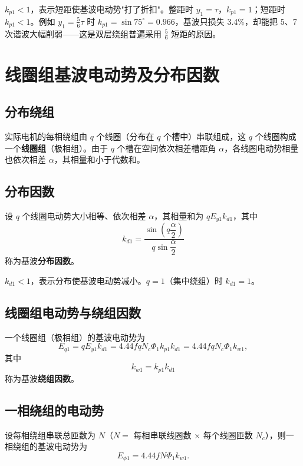 
$k_{p1}<1$，表示短距使基波电动势"打了折扣"。整距时 $y_1=\tau$，$k_{p1}=1$；短距时 $k_{p1}<1$。例如 $y_1=\tfrac56\tau$ 时 $k_{p1}=\sin75^\circ=0.966$，基波只损失 3.4\%，却能把 5、7 次谐波大幅削弱——这是双层绕组普遍采用 $\tfrac56$ 短距的原因。

\section{线圈组基波电动势及分布因数}

\subsection{分布绕组}
实际电机的每相绕组由 $q$ 个线圈（分布在 $q$ 个槽中）串联组成，这 $q$ 个线圈构成一个\textbf{线圈组}（极相组）。由于 $q$ 个槽在空间依次相差槽距角 $\alpha$，各线圈电动势相量也依次相差 $\alpha$，其相量和小于代数和。

\subsection{分布因数}
设 $q$ 个线圈电动势大小相等、依次相差 $\alpha$，其相量和为 $qE_{y1}k_{d1}$，其中
\begin{equation}
k_{d1}=\frac{\sin\left(q\dfrac{\alpha}{2}\right)}{q\sin\dfrac{\alpha}{2}}
\end{equation}
称为基波\textbf{分布因数}。


$k_{d1}<1$，表示分布使基波电动势减小。$q=1$（集中绕组）时 $k_{d1}=1$。

\subsection{线圈组电动势与绕组因数}
一个线圈组（极相组）的基波电动势为
\begin{equation}
E_{q1}=qE_{y1}k_{d1}=4.44fqN_c\Phi_1k_{p1}k_{d1}=4.44fqN_c\Phi_1k_{w1},
\end{equation}
其中
\begin{equation}
k_{w1}=k_{p1}k_{d1}
\end{equation}
称为基波\textbf{绕组因数}。

\subsection{一相绕组的电动势}
设每相绕组串联总匝数为 $N$（$N=$ 每相串联线圈数 $\times$ 每个线圈匝数 $N_c$），则一相绕组的基波电动势为
\begin{equation}
E_{\phi1}=4.44fN\Phi_1k_{w1}.
\end{equation}

